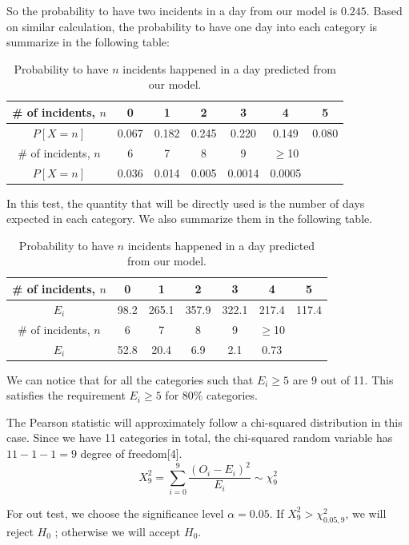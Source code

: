 \documentclass[11pt,a4paper,english]{article}
\begin{document}
So the probability to have two incidents in a day from our model is $0.245$.
Based on similar calculation, the probability to have one day into each category is summarize in the following table:
\begin{table}[htbp]
    \centering
	\begin{tabular}{c|cccccc}
		\hline
		\# of incidents, $n$ & 0 & 1 & 2 & 3 & 4 & 5\\
		\hline
		$P[X = n]$ & 0.067 & 0.182 & 0.245 & 0.220 & 0.149 & 0.080\\ 
		\hline
		\# of incidents, $n$  & 6 & 7 & 8 & 9 & $\geq$10 & \\
		\hline
		$P[X = n]$  & 0.036 & 0.014 & 0.005 & 0.0014 & 0.0005 & \\ 
		\hline
    \end{tabular}
	\caption{Probability to have $n$ incidents happened in a day predicted from our model.}
\end{table}

In this test, the quantity that will be directly used is the number of days expected in each category. We also summarize them in the following table.

\begin{table}[htbp]
    \centering
	\begin{tabular}{c|cccccc}
		\hline
		\# of incidents, $n$ & 0 & 1 & 2 & 3 & 4 & 5\\
		\hline
		$E_{i}$ & 98.2 & 265.1 & 357.9 & 322.1 & 217.4 & 117.4\\ 
		\hline
		\# of incidents, $n$  & 6 & 7 & 8 & 9 & $\geq$10 & \\
		\hline
		$E_{i}$  & 52.8 & 20.4 & 6.9 & 2.1 & 0.73 & \\ 
		\hline
    \end{tabular}
	\caption{Probability to have $n$ incidents happened in a day predicted from our model.}
\end{table}

We can notice that for all the categories such that $E_{i} \geq 5$ are 9 out of 11. This satisfies the requirement $E_{i} \geq 5$ for 80\% categories.

The Pearson statistic will approximately follow a chi-squared distribution in this case. Since we have 11 categories in total, the chi-squared random variable has $11-1-1 = 9$ degree of freedom[4].
\[X^{2}_{9} = \sum_{i = 0}^{9}
\frac{(O_{i}-E_{i})^{2}}{E_{i}} \sim \chi_{9}^{2}\]

For out test, we choose the significance level $\alpha = 0.05$. If $X^{2}_{9} > \chi_{0.05,9}^{2}$, we will reject $H_{0}$ ; otherwise we will accept $H_{0}$.
\end{document}
